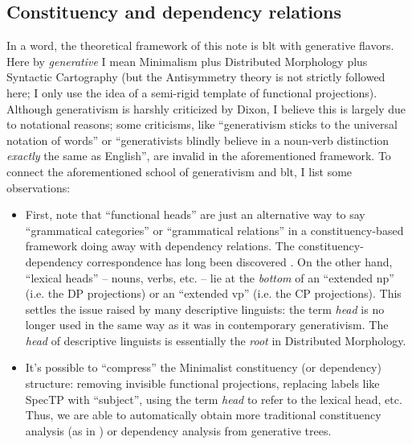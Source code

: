\documentclass[a4paper, oneside, 12pt]{report}
\newcommand*{\term}[1]{\emph{#1}}
\begin{document}
{\small

\subsection{Constituency and dependency relations}

In a word, the theoretical framework of this note 
is \ac{blt}\citep{dixon2009basic1,dixon2010basic2,dixon2012basic3}
with generative flavors.
Here by \term{generative} I mean 
Minimalism plus Distributed Morphology plus Syntactic Cartography 
(but the Antisymmetry theory is not strictly followed here; 
I only use the idea of a semi-rigid template of functional projections).
Although generativism is harshly criticized by Dixon, 
I believe this is largely due to notational reasons;
some criticisms, like ``generativism sticks to the universal notation of words''
or ``generativists blindly believe in a 
noun-verb distinction \emph{exactly} the same as English'',
are invalid in the aforementioned framework. 
To connect the aforementioned school of generativism and \ac{blt}, 
I list some observations:
\begin{itemize}
    \item First, note that ``functional heads'' are just 
        an alternative way to say ``grammatical categories'' or ``grammatical relations''
        in a constituency-based framework doing away with dependency relations.
        The constituency-dependency correspondence 
        has long been discovered 
        \citep{schneider1998linguistic,osborne2011bare,kahane2015syntactic,nefdt2023notational}. 
        On the other hand, 
        ``lexical heads'' -- nouns, verbs, etc. -- 
        lie at the \emph{bottom} of an ``extended \ac{np}'' (i.e. the DP projections) 
        or an ``extended \ac{vp}'' (i.e. the CP projections).
        This settles the issue raised by many descriptive linguists: 
        the term \term{head} is no longer used in the same way 
        as it was in contemporary generativism.
        The \term{head} of descriptive linguists is essentially the \term{root} in Distributed Morphology.
    \item It's possible to ``compress'' the Minimalist constituency (or dependency) structure: 
        removing invisible functional projections, 
        replacing labels like SpecTP with ``subject'',
        using the term \term{head} to refer to the lexical head, etc.
        Thus, we are able to automatically 
        obtain more traditional constituency analysis (as in \citet{cgel})
        or dependency analysis 
        from generative trees. 

\end{itemize}}
\end{document}

